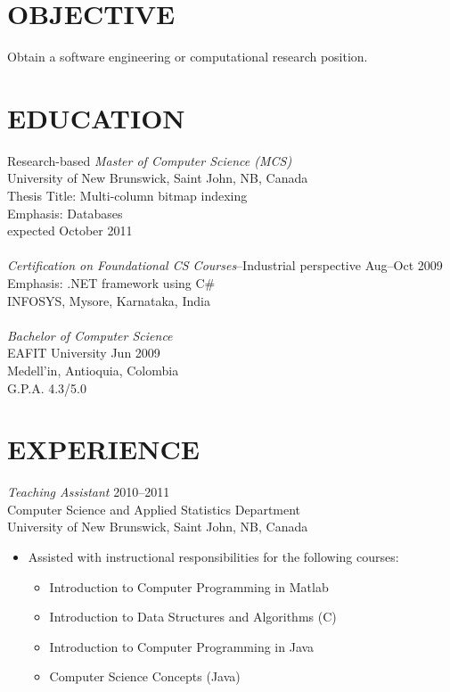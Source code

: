 \documentclass[line,margin]{res}
\begin{document}
\address{19603 Fernhaven, Katy, TX 77449}
\address{(281) 398-9692\\edvelez.g@gmail.com}

 
\begin{resume}

\section{OBJECTIVE} %
\label{sec:objective}
    Obtain a software engineering or computational research position.

\section{EDUCATION} %
\label{sec:education}
    Research-based {\sl Master of Computer Science (MCS)} \\
    University of New Brunswick, Saint John, NB, Canada\\
    Thesis Title: Multi-column bitmap indexing\\
    Emphasis: Databases\\
    expected October 2011 \\\\
    {\sl Certification on Foundational CS Courses}--Industrial perspective \hfill Aug--Oct 2009\\
    Emphasis: .NET framework using C\#\\
    INFOSYS, Mysore, Karnataka, India\\\\
    {\sl Bachelor of Computer Science}\\
    EAFIT University \hfill Jun 2009\\
    Medell\a'in, Antioquia, Colombia\\
    G.P.A. 4.3/5.0\\

\section{EXPERIENCE} %
\label{sec:experience}

{\sl Teaching Assistant} \hfill 2010--2011\\
Computer Science and Applied Statistics Department\\
University of New Brunswick, Saint John, NB, Canada
\begin{itemize} %
    \item Assisted with instructional responsibilities for the following courses:
    \begin{itemize} \itemsep -2pt
        \item Introduction to Computer Programming in Matlab
        \item Introduction to Data Structures and Algorithms (C)
        \item Introduction to Computer Programming in Java
        \item Computer Science Concepts (Java)
    \end{itemize}
\end{itemize}


\end{resume}
\end{document}
